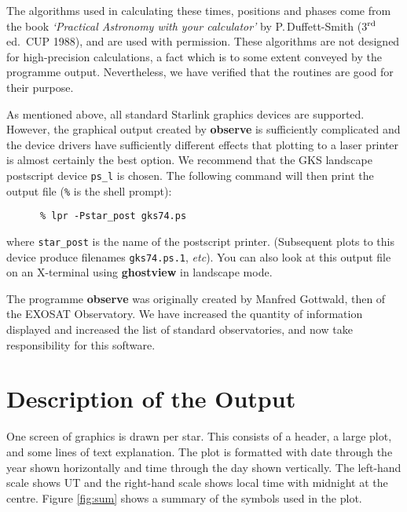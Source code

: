 The algorithms used in calculating these times, positions and phases
come from the book {\em{`Practical Astronomy with your calculator'}}  by
P.\,Duffett-Smith (3$^{\rm rd}$ ed.~CUP 1988), and are used with
permission. These algorithms are not designed for high-precision
calculations, a fact which is to some extent conveyed by the programme
output. Nevertheless, we have verified that the routines are good for
their purpose.

As mentioned above, all standard Starlink graphics devices are
supported.  However, the graphical output created by {\bf{observe}} is
sufficiently complicated and the device drivers have sufficiently
different effects that plotting to a laser printer is almost certainly
the best option. We recommend that the GKS landscape postscript device
{\tt{ps\_l}} is chosen.  The following command will then print the
output file ({\tt{\%}} is the shell prompt):

\begin{verbatim}
      % lpr -Pstar_post gks74.ps
\end{verbatim}

where {\tt{star\_post}} is the name of the postscript printer.
(Subsequent plots to this device produce filenames {\tt gks74.ps.1},
{\em{etc}}). You can also look at this output file on an X-terminal
using {\bf{ghostview}} in landscape mode.

The programme {\bf{observe}} was originally created by Manfred Gottwald,
then of the EXOSAT Observatory. We have increased the quantity of
information displayed and increased the list of standard observatories,
and now take responsibility for this software.


\section{Description of the Output}
\label{sec:description}

One screen of graphics is drawn per star. This consists of a header, a
large plot, and some lines of text explanation. The plot is formatted
with date through the year shown horizontally and time through the day
shown vertically. The  left-hand scale shows UT and the right-hand
scale shows local time with midnight at the centre. Figure
\ref{fig:sum} shows a summary of the symbols used in the plot.

